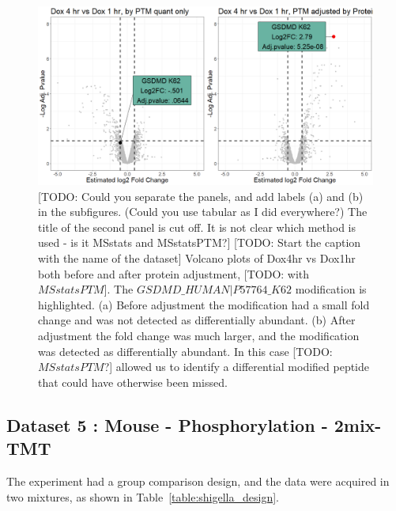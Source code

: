 \documentclass{mcp}
\def\todo#1{{\color{red}[TODO: #1]}}
\begin{document}
\begin{figure}[h!]
 \centering
	\includegraphics[width=.8\textwidth]{sim_new/IpaH_volcano_plot}
	\caption{\todo{Could you separate the panels, and add labels (a) and (b) in the subfigures. (Could you use tabular as I did everywhere?) The title of the second panel is cut off. It is not clear which method is used - is it MSstats and MSstatsPTM?} \todo{Start the caption with the name of the dataset} Volcano plots of Dox4hr vs Dox1hr both before and after protein adjustment, \todo{with $MSstatsPTM$}. The $GSDMD\_HUMAN|P57764\_K62$ modification is highlighted. (a) Before adjustment the modification had a small fold change and was not detected as differentially abundant. (b) After adjustment the fold change was much larger, and the modification was detected as differentially abundant. In this case \todo{$MSstatsPTM$?} allowed us to identify a differential modified peptide that could have otherwise been missed.}
\label{fig:ipah_figures}
\end{figure}

\clearpage
\subsection{Dataset 5 : Mouse - Phosphorylation - 2mix-TMT}
\label{sec:shigella}

The experiment had a group comparison design, and the data were acquired in two mixtures, as shown in Table~\ref{table:shigella_design}.
\end{document}
